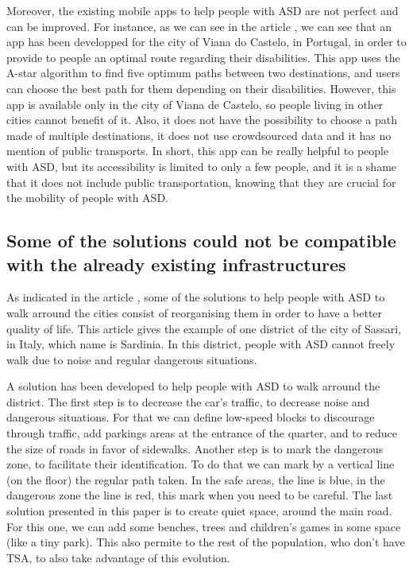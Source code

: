 Moreover, the existing mobile apps to help people with ASD are not perfect and can be improved. For instance, as we can see in the article \cite{2023AccessibilityStrategiesPromote}, we can see that an app has been developped for the city of Viana do Castelo, in Portugal, in order to provide to people an optimal route regarding their disabilities. This app uses the A-star algorithm to find five optimum paths between two destinations, and users can choose the best path for them depending on their disabilities. However, this app is available only in the city of Viana de Castelo, so people living in other cities cannot benefit of it. Also, it does not have the possibility to choose a path made of multiple destinations, it does not use crowdsourced data and it has no mention of public transports. In short, this app can be really helpful to people with ASD, but its accessibility is limited to only a few people, and it is a shame that it does not include public transportation, knowing that they are crucial for the mobility of people with ASD.  
\subsection{Some of the solutions could not be compatible with the already existing infrastructures}
As indicated in the article \cite{2018MobilityPoliciesExtraSmall}, some of the solutions to help people with ASD to walk arround the cities consist of reorganising them in order to have a better quality of life. This article gives the example of one district of the city of Sassari, in Italy, which name is Sardinia. In this district, people with ASD cannot freely walk due to noise and regular dangerous situations. 

A solution has been developed to help people with ASD to walk arround the district. The first step is to decrease the car’s traffic, to decrease noise and dangerous situations.  For that we can define low-speed blocks to discourage through traffic, add parkings areas at the entrance of the quarter, and to reduce the size of roads in favor of sidewalks. Another step is to mark the dangerous zone, to facilitate their identification. To do that we can mark by a vertical line (on the floor) the regular path taken. In the safe areas, the line is blue, in the dangerous zone the line is red, this mark when you need to be careful. The last solution presented in this paper is to create quiet space, around the main road. For this one, we can add some benches, trees and children's games in some space (like a tiny park). This also permite to the rest of the population, who don’t have TSA, to also take advantage of this evolution.

